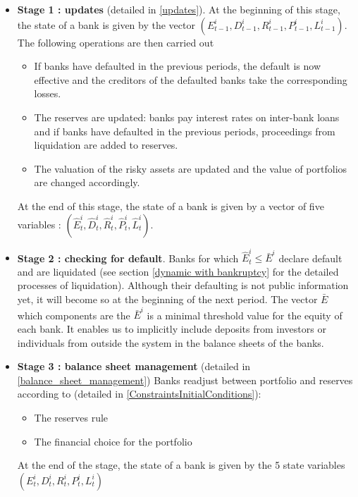 \documentclass{article}
\newcommand{\wh}{\widehat}
\begin{document}
\begin{itemize}

\item \textbf{Stage 1 : updates} (detailed in \ref{updates}). At the beginning of this stage, the state of a bank is given by the vector $(E^i_{t-1}, D^i_{t-1}, R^i_{t-1}, P^i_{t-1}, L^i_{t-1})$. The following operations are then carried out
\begin{itemize}
    \item If banks have defaulted in the previous periods, the default is now effective and the creditors of the defaulted banks take the corresponding losses.
    \item The reserves are updated: banks pay interest rates on inter-bank loans and if banks have defaulted in the previous periods, proceedings from liquidation are added to reserves. 
    \item The valuation of the risky assets are updated and the value of portfolios are changed accordingly.
\end{itemize}

At the end of this stage, the state of a bank is given by a vector of five variables :
$(\widehat{E}^i_t, \widehat{D}^i_t, \widehat{R}^i_t, \widehat{P}^i_t, \widehat{L}^i_t)$.

\item \textbf{Stage 2 : checking for default}. Banks for which $\wh E_t^i \leq \bar{E}^i$ declare
default and are liquidated (see section \ref{dynamic with bankruptcy} for the detailed processes of liquidation). Although their defaulting is not public information yet, it will become so at the beginning of the next period. The vector $\bar{E}$ which components are the $\bar{E}^i$ is a minimal threshold value for the equity of each bank. It enables us to implicitly include deposits from investors or individuals from outside the system in the balance sheets of the banks.

\item \textbf{Stage 3 : balance sheet management} (detailed in \ref{balance_sheet_management})
Banks readjust between portfolio and reserves according to (detailed in \ref{ConstraintsInitialConditions}):
\begin{itemize}
    \item The reserves rule
    \item The financial choice for the portfolio
\end{itemize}

At the end of the stage, the state of a bank is given by the 5 state variables $(E^i_t, D^i_t, R^i_t, P^i_t, L^i_t)$

\end{itemize}
\end{document}
